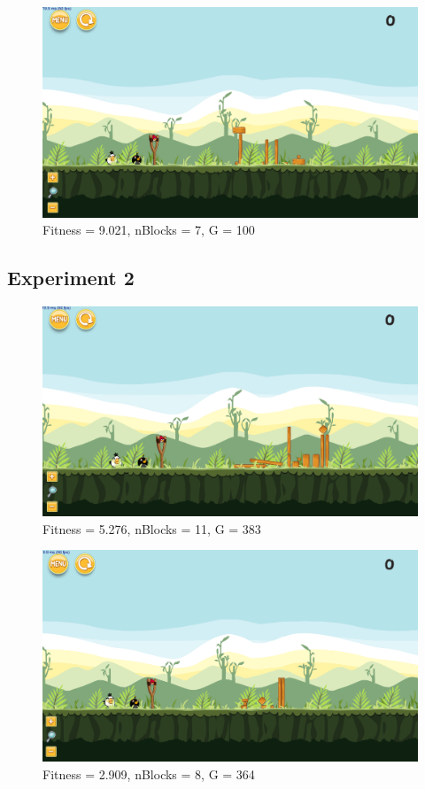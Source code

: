 \begin{figure}[H]
	\centering
	\includegraphics[scale=0.35]{gfx/e1//level-0-180523_203106.png}
	\caption{Fitness = 9.021, nBlocks = 7, G = 100  }\label{f:e1-4}
\end{figure}

\subsection{Experiment 2}\label{a:e2}

\begin{figure}[H]
	\centering
	\includegraphics[scale=0.35]{gfx/e2/level-0-base_large180524_182751.png}
	\caption{Fitness = 5.276, nBlocks = 11, G = 383 }\label{f:e2-1}
\end{figure}

\begin{figure}[H]
	\centering
	\includegraphics[scale=0.35]{gfx/e2/level-0-base_large180525_034217.png}
	\caption{Fitness = 2.909, nBlocks = 8, G = 364 }\label{f:e2-2}
\end{figure}

